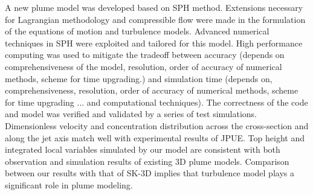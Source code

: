 \documentclass[journal abbreviation, manuscript]{copernicus}
\begin{document}
%
%
%

\conclusions  \label{sec:conclusion}%
A new plume model was developed based on SPH method. Extensions necessary for Lagrangian methodology and compressible flow were made in the formulation of the equations of motion and turbulence models. Advanced numerical techniques in SPH were exploited and tailored for this model. High performance computing was used to mitigate the tradeoff between accuracy (depends on comprehensiveness of the model, resolution, order of accuracy of numerical methods, scheme for time upgrading.) and simulation time (depends on, comprehensiveness, resolution, order of accuracy of numerical methods, scheme for time upgrading ... and computational techniques). The correctness of the code and model was verified and validated by a series of test simulations. Dimensionless velocity and concentration distribution across the cross-section and along the jet axis match well with experimental results of JPUE. Top height and integrated local variables simulated by our model are consistent with both observation and simulation results of existing 3D plume models. Comparison between our results with that of SK-3D implies that turbulence model plays a significant role in plume modeling.
\end{document}
